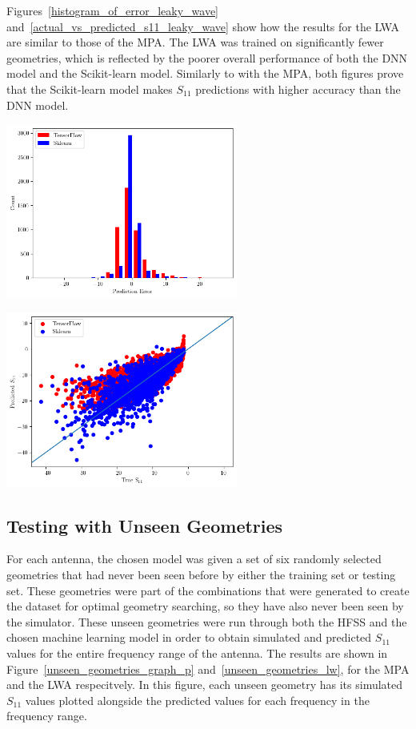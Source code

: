 \documentclass[conference]{IEEEtran}
\newenvironment{Figure}
    {\par\medskip\noindent\minipage{\linewidth}}
    {\endminipage\par\medskip}
\begin{document}
Figures~\ref{histogram_of_error_leaky_wave} and~\ref{actual_vs_predicted_s11_leaky_wave} show how the results for the LWA are similar to those of the MPA. The LWA was trained on significantly fewer geometries, which is reflected by the poorer overall performance of both the DNN model and the Scikit-learn model. Similarly to with the MPA, both figures prove that the Scikit-learn model makes $S_{11}$ predictions with higher accuracy than the DNN model.

\begin{Figure}
    \centering
    \includegraphics[width=3in]{histogram_leaky_wave}
    \label{histogram_of_error_leaky_wave}
\end{Figure}

\begin{Figure}
    \centering
    \includegraphics[width=3in]{actual_vs_predicted_s11_leaky_wave}
    \label{actual_vs_predicted_s11_leaky_wave}
\end{Figure}

\subsection{Testing with Unseen Geometries}
For each antenna, the chosen model was given a set of six randomly selected geometries that had never been seen before by either the training set or testing set. These geometries were part of the combinations that were generated to create the dataset for optimal geometry searching, so they have also never been seen by the simulator. These unseen geometries were run through both the HFSS and the chosen machine learning model in order to obtain simulated and predicted $S_{11}$ values for the entire frequency range of the antenna. The results are shown in Figure~\ref{unseen_geometries_graph_p} and~\ref{unseen_geometries_lw}, for the MPA and the LWA respecitvely. In this figure, each unseen geometry has its simulated $S_{11}$ values plotted alongside the predicted values for each frequency in the frequency range.
\end{document}

